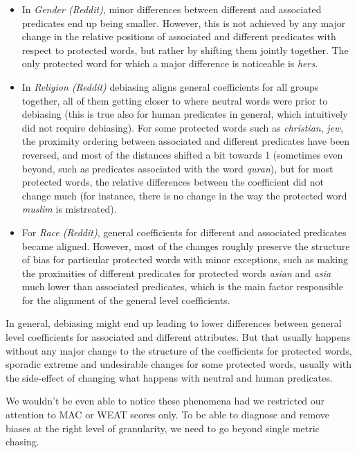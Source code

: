 \documentclass[
  12pt,
  dvipsnames,enabledeprecatedfontcommands]{scrartcl}
\begin{document}
\begin{itemize}
\item
  In \emph{Gender (Reddit)}, minor differences between different and
  associated predicates end up being smaller. However, this is not
  achieved by any major change in the relative positions of associated
  and different predicates with respect to protected words, but rather
  by shifting them jointly together. The only protected word for which a
  major difference is noticeable is \emph{hers}.
\item
  In \emph{Religion (Reddit)} debiasing aligns general coefficients for
  all groups together, all of them getting closer to where neutral words
  were prior to debiasing (this is true also for human predicates in
  general, which intuitively did not require debiasing). For some
  protected words such as \emph{christian}, \emph{jew}, the proximity
  ordering between associated and different predicates have been
  reversed, and most of the distances shifted a bit towards 1 (sometimes
  even beyond, such as predicates associated with the word
  \emph{quran}), but for most protected words, the relative differences
  between the coefficient did not change much (for instance, there is no
  change in the way the protected word \emph{muslim} is mistreated).
\item
  For \emph{Race (Reddit)}, general coefficients for different and
  associated predicates became aligned. However, most of the changes
  roughly preserve the structure of bias for particular protected words
  with minor exceptions, such as making the proximities of different
  predicates for protected words \emph{asian} and \emph{asia} much lower
  than associated predicates, which is the main factor responsible for
  the alignment of the general level coefficients.
\end{itemize}

In general, debiasing might end up leading to lower differences between
general level coefficients for associated and different attributes. But
that usually happens without any major change to the structure of the
coefficients for protected words, sporadic extreme and undesirable
changes for some protected words, usually with the side-effect of
changing what happens with neutral and human predicates.

We wouldn't be even able to notice these phenomena had we restricted our
attention to \textsf{MAC} or \textsf{WEAT} scores only. To be able to
diagnose and remove biases at the right level of granularity, we need to
go beyond single metric chasing.
\end{document}
